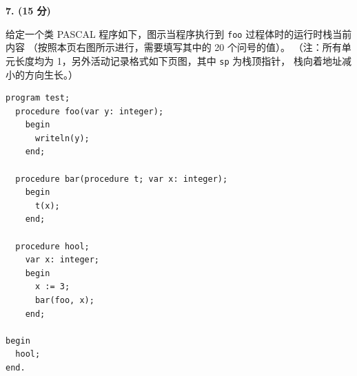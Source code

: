 \documentclass[UTF8,zihao=-4]{ctexart}
\newcommand{\score}[1]{\textbf{(#1 分)}}
\newcommand{\qtitle}[3]{\vspace{0.6em}\textbf{#1. \score{#2} #3}\par}
\newcommand{\kw}[1]{\texttt{#1}}
\begin{document}
\qtitle{7}{15}{}
给定一个类 PASCAL 程序如下，图示当程序执行到 \kw{foo} 过程体时的运行时栈当前内容
（按照本页右图所示进行，需要填写其中的 20 个问号的值）。
（注：所有单元长度均为 1，另外活动记录格式如下页图，其中 \kw{sp} 为栈顶指针，
栈向着地址减小的方向生长。）

\begin{minipage}[t]{0.54\textwidth}
\begin{lstlisting}
program test;
  procedure foo(var y: integer);
    begin
      writeln(y);
    end;

  procedure bar(procedure t; var x: integer);
    begin
      t(x);
    end;

  procedure hool;
    var x: integer;
    begin
      x := 3;
      bar(foo, x);
    end;

begin
  hool;
end.
\end{lstlisting}
\end{minipage}
\hfill
\end{document}
